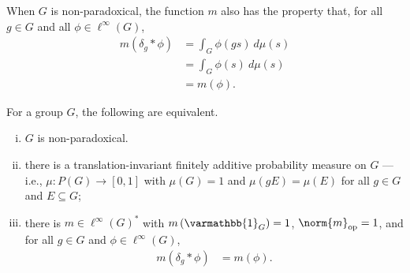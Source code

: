 \documentclass[10pt]{mypackage}
\renewcommand*{\mathbb}[1]{\varmathbb{#1}}
\begin{document}
  When $G$ is non-paradoxical, the function $m$ also has the property that, for all $g\in G$ and all $\phi \in \ell^{\infty}\left(G\right)$,
  \begin{align*}
    m\left(\delta_{g}\ast \phi\right) &= \int_{G}^{} \phi\left(gs\right)\:d\mu(s)\\
                                      &= \int_{G}^{} \phi\left(s\right)\:d\mu(s)\\
                                      &= m\left(\phi\right).
  \end{align*}
  \begin{corollary}
    For a group $G$, the following are equivalent.
    \begin{enumerate}[(i)]
      \item $G$ is non-paradoxical.
      \item there is a translation-invariant finitely additive probability measure on $G$ --- i.e., $\mu: P(G)\rightarrow [0,1]$ with $\mu(G) = 1$ and $\mu(gE) = \mu(E)$ for all $g\in G$ and $E\subseteq G$;
      \item there is $m\in \ell^{\infty}\left(G\right)^{\ast}$ with $m\left(\mathbb{1}_{G}\right) = 1$, $\norm{m}_{\text{op}} = 1$, and for all $g\in G$ and $\phi \in \ell^{\infty}\left(G\right)$,
        \begin{align*}
          m\left(\delta_{g}\ast \phi\right) &= m\left(\phi\right).
        \end{align*}
    \end{enumerate}
  \end{corollary}
\end{document}
